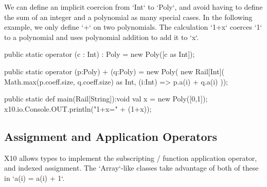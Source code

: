 \begin{ex}
We can define an implicit coercion from \xcd`Int` to \xcd`Poly`,
and avoid having to define the sum of an integer and a polynomial
as many special cases.  In the following example, we only define \xcd`+` on
two polynomials.  The
calculation \xcd`1+x` coerces \xcd`1` to a polynomial and uses polynomial
addition to add it to \xcd`x`.


\begin{xten}
  public static operator (c : Int) : Poly 
     = new Poly([c as Int]);

  public static operator (p:Poly) + (q:Poly) = new Poly(
      new Rail[Int](
        Math.max(p.coeff.size, q.coeff.size) as Int,
        (i:Int) => p.a(i) + q.a(i)
     ));

  public static def main(Rail[String]):void {
     val x = new Poly([0,1]);
     x10.io.Console.OUT.println("1+x=" + (1+x));
  }
\end{xten}
\end{ex}



\subsection{Assignment and Application Operators}
\index{()}
\index{()=}
\label{set-and-apply}
X10 allows types to implement the subscripting / function application
operator, and indexed assignment.  The \xcd`Array`-like classes take advantage
of both of these in \xcd`a(i) = a(i) + 1`.  

